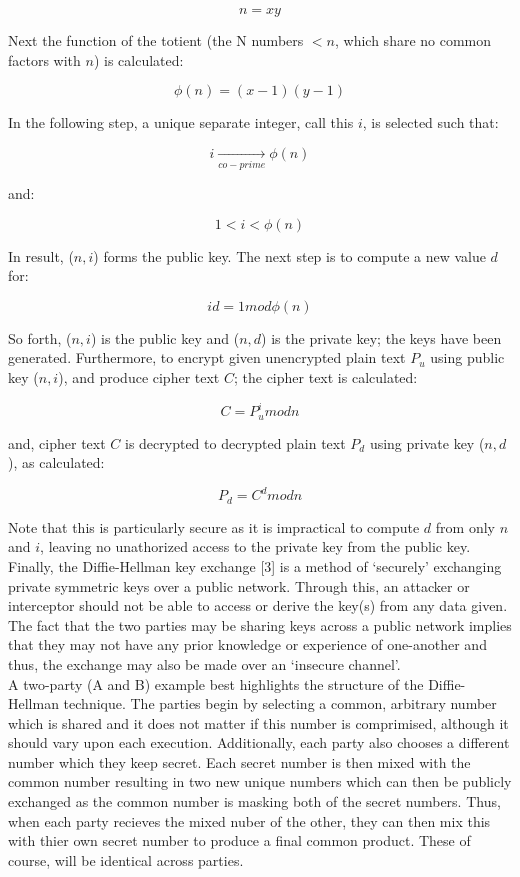 \documentclass[11pt, english]{article}
\begin{document}
	$$n=xy$$

	Next the function of the totient (the N numbers $<n$, which share no common factors with $n$) is calculated:

	$$\phi(n)=(x-1)(y-1)$$

	In the following step, a unique separate integer, call this $i$, is selected such that:

	$$i\xrightarrow[co-prime]{}\phi(n)$$

	and:

	$$1<i<\phi(n)$$

	In result, ($n,i$) forms the public key. The next step is to compute a new value $d$ for:

	$$id=1mod\phi(n)$$

	So forth, ($n,i$) is the public key and ($n,d$) is the private key; the keys have been generated. Furthermore, to encrypt given unencrypted plain text $P_{u}$ using public key ($n,i$), and produce cipher text $C$; the cipher text is calculated:

	$$C=P_{u}^{i}modn$$

	and, cipher text $C$ is decrypted to decrypted plain text $P_{d}$ using private key ($n,d$), as calculated:

	$$P_{d}=C^{d}modn$$

	Note that this is particularly secure as it is impractical to compute $d$ from only $n$ and $i$, leaving no unathorized access to the private key from the public key.\\

	Finally, the Diffie-Hellman key exchange [3] is a method of `securely' exchanging private symmetric keys over a public network. Through this, an attacker or interceptor should not be able to access or derive the key(s) from any data given. The fact that the two parties may be sharing keys across a public network implies that they may not have any prior knowledge or experience of one-another and thus, the exchange may also be made over an `insecure channel'.\\

	A two-party (A and B) example best highlights the structure of the Diffie-Hellman technique. The parties begin by selecting a common, arbitrary number which is shared and it does not matter if this number is comprimised, although it should vary upon each execution. Additionally, each party also chooses a different number which they keep secret. Each secret number is then mixed with the common number resulting in two new unique numbers which can then be publicly exchanged as the common number is masking both of the secret numbers. Thus, when each party recieves the mixed nuber of the other, they can then mix this with thier own secret number to produce a final common product. These of course, will be identical across parties.\\
\end{document}

